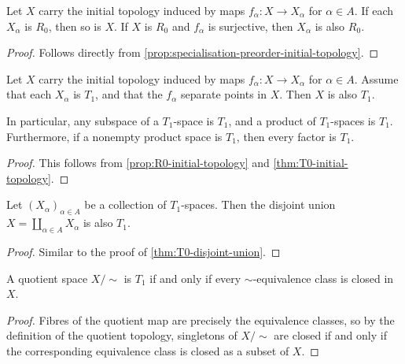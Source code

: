 \documentclass[article, a4paper, 11pt, oneside]{memoir}
\numberwithin{equation}{chapter}
\begin{document}
\begin{proposition}
    \label{prop:R0-initial-topology}
    Let $X$ carry the initial topology induced by maps $f_\alpha \colon X \to X_\alpha$ for $\alpha \in A$. If each $X_\alpha$ is $R_0$, then so is $X$. If $X$ is $R_0$ and $f_\alpha$ is surjective, then $X_\alpha$ is also $R_0$.
\end{proposition}

\begin{proof}
    Follows directly from \cref{prop:specialisation-preorder-initial-topology}.
\end{proof}


\begin{proposition}
    \label{thm:T1-initial-topology}
    Let $X$ carry the initial topology induced by maps $f_\alpha \colon X \to X_\alpha$ for $\alpha \in A$. Assume that each $X_\alpha$ is $T_1$, and that the $f_\alpha$ separate points in $X$. Then $X$ is also $T_1$.

    In particular, any subspace of a $T_1$-space is $T_1$, and a product of $T_1$-spaces is $T_1$. Furthermore, if a nonempty product space is $T_1$, then every factor is $T_1$.
\end{proposition}

\begin{proof}
    This follows from \cref{prop:R0-initial-topology} and \cref{thm:T0-initial-topology}.
\end{proof}


\begin{proposition}
    Let $(X_\alpha)_{\alpha \in A}$ be a collection of $T_1$-spaces. Then the disjoint union $X = \coprod_{\alpha \in A} X_\alpha$ is also $T_1$.
\end{proposition}

\begin{proof}
    Similar to the proof of \cref{thm:T0-disjoint-union}.
\end{proof}


\begin{proposition}
    A quotient space $X/{\sim}$ is $T_1$ if and only if every $\sim$-equivalence class is closed in $X$.
\end{proposition}

\begin{proof}
    Fibres of the quotient map are precisely the equivalence classes, so by the definition of the quotient topology, singletons of $X/{\sim}$ are closed if and only if the corresponding equivalence class is closed as a subset of $X$.
\end{proof}
\end{document}
